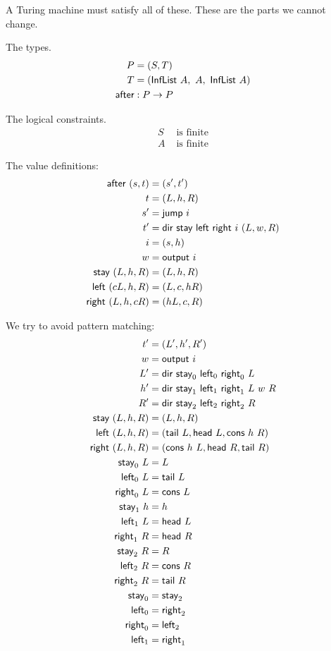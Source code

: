 A Turing machine must satisfy all of these.
These are the parts we cannot change.

The types.
\begin{align}
    P &= (S,T)
    \\
    T &= (\textsf{InfList}~A, ~ A, ~ \textsf{InfList}~A)
    \\
    \textsf{after} &: P \to P
\end{align}

The logical constraints.
\begin{align}
    S &\text{ is finite}
    \\
    A &\text{ is finite}
\end{align}

The value definitions:
\begin{align}
    \textsf{after}~(s,t) &= (s',t')
    \\
    t &= (L,h,R)
    \\
    s' &= \textsf{jump}~i
    \\
    t' &= \textsf{dir}~\textsf{stay}~\textsf{left}~\textsf{right}~i~(L,w,R)
    \\
    i &= (s,h)
    \\
    w &= \textsf{output}~i
    \\
    \textsf{stay}~(L,h,R) &= (L,h,R)
    \\
    \textsf{left}~(cL,h,R) &= (L,c,hR)
    \\
    \textsf{right}~(L,h,cR) &= (hL,c,R)
\end{align}

We try to avoid pattern matching:
\begin{align}
    t' &= (L',h',R')
    \\
    w &= \textsf{output}~i
    \\
    L' &= \textsf{dir}~\textsf{stay}_0~\textsf{left}_0~\textsf{right}_0~L
    \\
    h' &= \textsf{dir}~\textsf{stay}_1~\textsf{left}_1~\textsf{right}_1~L~w~R
    \\
    R' &= \textsf{dir}~\textsf{stay}_2~\textsf{left}_2~\textsf{right}_2~R
    \\
    \textsf{stay}~(L,h,R) &= (L,h,R)
    \\
    \textsf{left}~(L,h,R) &= (\textsf{tail}~L, \textsf{head}~L, \textsf{cons}~h~R)
    \\
    \textsf{right}~(L,h,R) &= (\textsf{cons}~h~L, \textsf{head}~R, \textsf{tail}~R)
    \\
    \textsf{stay}_0~L &= L
    \\
    \textsf{left}_0~L &= \textsf{tail}~L
    \\
    \textsf{right}_0~L &= \textsf{cons}~L
    \\
    \textsf{stay}_1~h &= h
    \\
    \textsf{left}_1~L &= \textsf{head}~L
    \\
    \textsf{right}_1~R &= \textsf{head}~R
    \\
    \textsf{stay}_2~R &= R
    \\
    \textsf{left}_2~R &= \textsf{cons}~R
    \\
    \textsf{right}_2~R &= \textsf{tail}~R
    \\
    \textsf{stay}_0 &= \textsf{stay}_2
    \\
    \textsf{left}_0 &= \textsf{right}_2
    \\
    \textsf{right}_0 &= \textsf{left}_2
    \\
    \textsf{left}_1 &= \textsf{right}_1
\end{align}

